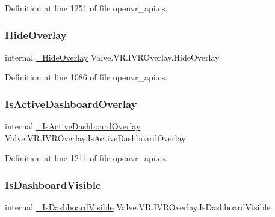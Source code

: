 Definition at line 1251 of file openvr\+\_\+api.\+cs.

\mbox{\label{struct_valve_1_1_v_r_1_1_i_v_r_overlay_afc24a9682c1ec15721de6708392825e3}} 
\subsubsection{\texorpdfstring{HideOverlay}{HideOverlay}}
{\footnotesize\ttfamily internal \mbox{\hyperlink{struct_valve_1_1_v_r_1_1_i_v_r_overlay_aa37a48da1e178713f92a56c045d5b50e}{\+\_\+\+Hide\+Overlay}} Valve.\+V\+R.\+I\+V\+R\+Overlay.\+Hide\+Overlay}



Definition at line 1086 of file openvr\+\_\+api.\+cs.

\mbox{\label{struct_valve_1_1_v_r_1_1_i_v_r_overlay_a7038a35d661d68a89fc0899c6a23ea45}} 
\subsubsection{\texorpdfstring{IsActiveDashboardOverlay}{IsActiveDashboardOverlay}}
{\footnotesize\ttfamily internal \mbox{\hyperlink{struct_valve_1_1_v_r_1_1_i_v_r_overlay_a243e44cc1a50df0d00c3fd8f681ab050}{\+\_\+\+Is\+Active\+Dashboard\+Overlay}} Valve.\+V\+R.\+I\+V\+R\+Overlay.\+Is\+Active\+Dashboard\+Overlay}



Definition at line 1211 of file openvr\+\_\+api.\+cs.

\mbox{\label{struct_valve_1_1_v_r_1_1_i_v_r_overlay_a9e719d337e065a94b31e56049f503901}} 
\subsubsection{\texorpdfstring{IsDashboardVisible}{IsDashboardVisible}}
{\footnotesize\ttfamily internal \mbox{\hyperlink{struct_valve_1_1_v_r_1_1_i_v_r_overlay_ae7389cf53d82e68927097e901093c534}{\+\_\+\+Is\+Dashboard\+Visible}} Valve.\+V\+R.\+I\+V\+R\+Overlay.\+Is\+Dashboard\+Visible}



